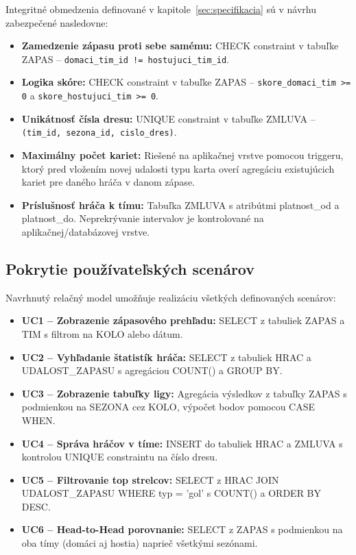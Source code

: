 \documentclass[11pt, a4paper]{article}
\begin{document}
Integritné obmedzenia definované v kapitole~\ref{sec:specifikacia} sú v návrhu zabezpečené nasledovne:

\begin{itemize}
    \item \textbf{Zamedzenie zápasu proti sebe samému:} CHECK constraint v tabuľke ZAPAS -- \texttt{domaci\_tim\_id != hostujuci\_tim\_id}.
    \item \textbf{Logika skóre:} CHECK constraint v tabuľke ZAPAS -- \texttt{skore\_domaci\_tim >= 0} a \texttt{skore\_hostujuci\_tim >= 0}.
    \item \textbf{Unikátnosť čísla dresu:} UNIQUE constraint v tabuľke ZMLUVA -- \texttt{(tim\_id, sezona\_id, cislo\_dres)}.
    \item \textbf{Maximálny počet kariet:} Riešené na aplikačnej vrstve pomocou triggeru, ktorý pred vložením novej udalosti typu karta overí agregáciu existujúcich kariet pre daného hráča v danom zápase.
    \item \textbf{Príslušnosť hráča k tímu:} Tabuľka ZMLUVA s atribútmi platnost\_od a platnost\_do. Neprekrývanie intervalov je kontrolované na aplikačnej/databázovej vrstve.
\end{itemize}

\subsection{Pokrytie používateľských scenárov}

Navrhnutý relačný model umožňuje realizáciu všetkých definovaných scenárov:

\begin{itemize}
    \item \textbf{UC1 -- Zobrazenie zápasového prehľadu:} SELECT z tabuliek ZAPAS a TIM s filtrom na KOLO alebo dátum.
    \item \textbf{UC2 -- Vyhľadanie štatistík hráča:} SELECT z tabuliek HRAC a UDALOST\_ZAPASU s agregáciou COUNT() a GROUP BY.
    \item \textbf{UC3 -- Zobrazenie tabuľky ligy:} Agregácia výsledkov z tabuľky ZAPAS s podmienkou na SEZONA cez KOLO, výpočet bodov pomocou CASE WHEN.
    \item \textbf{UC4 -- Správa hráčov v tíme:} INSERT do tabuliek HRAC a ZMLUVA s kontrolou UNIQUE constraintu na číslo dresu.
    \item \textbf{UC5 -- Filtrovanie top strelcov:} SELECT z HRAC JOIN UDALOST\_ZAPASU WHERE typ = 'gol' s COUNT() a ORDER BY DESC.
    \item \textbf{UC6 -- Head-to-Head porovnanie:} SELECT z ZAPAS s podmienkou na oba tímy (domáci aj hostia) naprieč všetkými sezónami.
\end{itemize}
\end{document}
